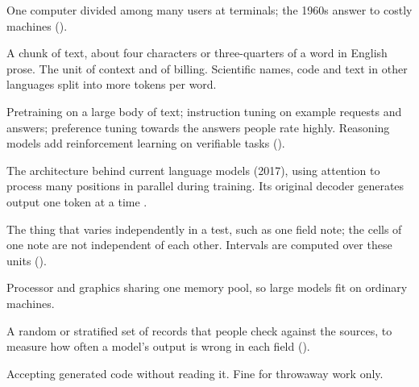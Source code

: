 \begin{description}[itemsep=0.2em]
\item[Time-sharing] One computer divided among many users at terminals; the
  1960s answer to costly machines ().

\item[Token] A chunk of text, about four characters or three-quarters of a
  word in English prose. The unit of context and of billing. Scientific
  names, code and text in other languages split into more tokens per word.

\item[Training stages] Pretraining on a large body of text; instruction tuning
  on example requests and answers; preference tuning towards the answers
  people rate highly. Reasoning models add reinforcement learning on
  verifiable tasks \parencite{ouyang2022instructgpt,guo2025deepseekr1}
  ().

\item[Transformer] The architecture behind current language models (2017),
  using attention to process many positions in parallel during training.
  Its original decoder generates output one token at a time
  \parencite{vaswani2017attention}.

\item[Unit of replication] The thing that varies independently in a test,
  such as one field note; the cells of one note are not independent of each
  other. Intervals are computed over these units ().

\item[Unified memory] Processor and graphics sharing one memory pool, so large
  models fit on ordinary machines.

\item[Validation sample] A random or stratified set of records that people
  check against the sources, to measure how often a model's output is wrong
  in each field ().

\item[Vibe coding] Accepting generated code without reading it. Fine for
  throwaway work only.

\end{description}
